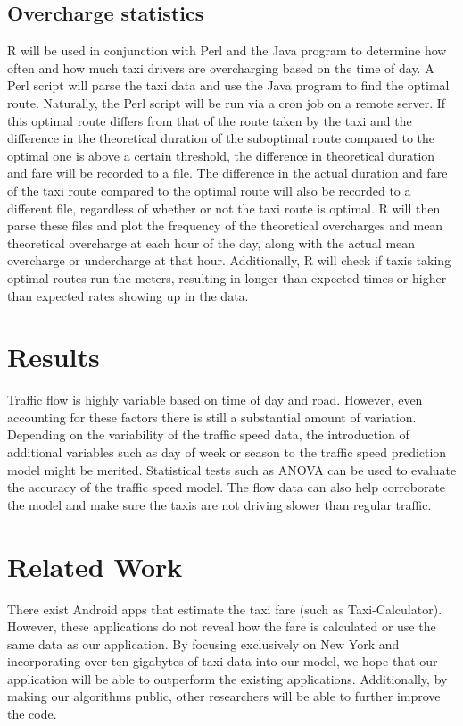 \documentclass{sig-alternate}
\begin{document}
\subsection{Overcharge statistics}
R will be used in conjunction with Perl and the Java program to determine how often and how much taxi drivers are overcharging based on the time of day. A Perl script will parse the taxi data and use the Java program to find the optimal route. Naturally, the Perl script will be run via a cron job on a remote server. If this optimal route differs from that of the route taken by the taxi and the difference in the theoretical duration of the suboptimal route compared to the optimal one is above a certain threshold, the difference in theoretical duration and fare will be recorded to a file. The difference in the actual duration and fare of the taxi route compared to the optimal route will also be recorded to a different file, regardless of whether or not the taxi route is optimal. R will then parse these files and plot the frequency of the theoretical overcharges and mean theoretical overcharge at each hour of the day, along with the actual mean overcharge or undercharge at that hour. Additionally, R will check if taxis taking optimal routes run the meters, resulting in longer than expected times or higher than expected rates showing up in the data.

\section{Results}
Traffic flow is highly variable based on time of day and road. However, even accounting for these factors there is still a substantial amount of variation. Depending on the variability of the traffic speed data, the introduction of additional variables such as day of week or season to the traffic speed prediction model might be merited. Statistical tests such as ANOVA can be used to evaluate the accuracy of the traffic speed model. The flow data can also help corroborate the model and make sure the taxis are not driving slower than regular traffic.

\section{Related Work}
There exist Android apps that estimate the taxi fare (such as Taxi-Calculator). However, these applications do not reveal how the fare is calculated or use the same data as our application. By focusing exclusively on New York and incorporating over ten gigabytes of taxi data into our model, we hope that our application will be able to outperform the existing applications. Additionally, by making our algorithms public, other researchers will be able to further improve the code.
\end{document}
